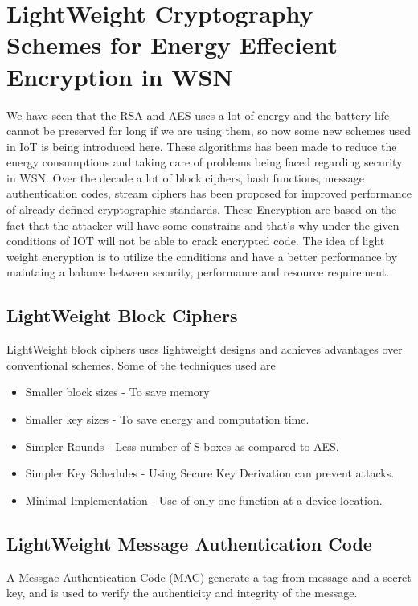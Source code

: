 \documentclass[conference]{IEEEtran}
\begin{document}
\section{LightWeight Cryptography Schemes for Energy Effecient Encryption in WSN}
\begin{flushleft}
We have seen that the RSA and AES uses a lot of energy and the battery life cannot be preserved for long if we are using them, so now some new schemes used in IoT is being introduced here. These algorithms has been made to reduce the energy consumptions and taking care of problems being faced regarding security in WSN.
\linebreak
Over the decade a lot of block ciphers, hash functions, message authentication codes, stream ciphers has been proposed for improved performance of already defined cryptographic standards. These Encryption are based on the fact that the attacker will have some constrains and that's why under the given conditions of IOT will not be able to crack encrypted code. The idea of light weight encryption is to utilize the conditions and have a better performance by maintaing a balance between security, performance and resource requirement.
\end{flushleft}

\subsection{LightWeight Block Ciphers}
LightWeight block ciphers uses lightweight designs and achieves advantages over conventional schemes. Some of the techniques used are
\begin{itemize}
  \item Smaller block sizes - To save memory
  \item Smaller key sizes - To save energy and computation time.
  \item Simpler Rounds - Less number of S-boxes as compared to AES.
  \item Simpler Key Schedules - Using Secure Key Derivation can prevent attacks.
  \item Minimal Implementation - Use of only one function at a device location.
\end{itemize}

\subsection{LightWeight Message Authentication Code}
A Messgae Authentication Code (MAC) generate a tag from message and a secret key, and is used to verify the authenticity and integrity of the message.
\end{document}
